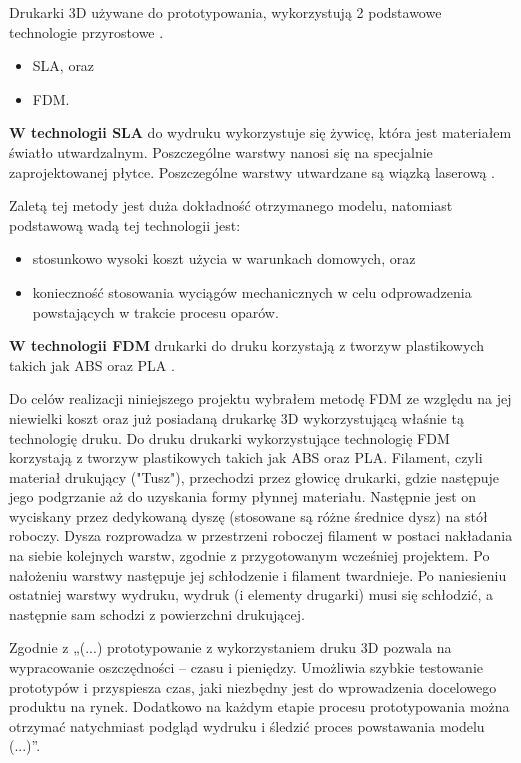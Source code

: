 \documentclass[a4paper,12pt,reqno]{article}
\begin{document}
Drukarki 3D używane do prototypowania, wykorzystują 2 podstawowe technologie przyrostowe
\cite{prototyp3dzalety}.
\begin{itemize}
\item SLA, oraz
\item FDM.
\end{itemize}
\textbf{W technologii SLA} do wydruku wykorzystuje się żywicę, która jest materiałem światło utwardzalnym. Poszczególne warstwy nanosi się na specjalnie zaprojektowanej płytce. Poszczególne warstwy utwardzane są wiązką laserową \cite{jakie_materialy_w_druku}.

Zaletą tej metody jest duża dokładność otrzymanego modelu, natomiast podstawową wadą tej technologii jest:
\begin{itemize}
\item stosunkowo wysoki koszt użycia w warunkach domowych, oraz
\item konieczność stosowania wyciągów mechanicznych w celu odprowadzenia powstających w trakcie procesu oparów.
\end{itemize}

\textbf{W technologii FDM} drukarki do druku korzystają z tworzyw plastikowych takich jak ABS oraz PLA \cite{jak_wybrac_tworzywo_do_drukarek} \cite{jakie_materialy_w_druku}.

Do celów realizacji niniejszego projektu wybrałem metodę FDM ze względu na jej niewielki koszt oraz już posiadaną drukarkę 3D wykorzystującą właśnie tą technologię druku. 
Do druku drukarki wykorzystujące technologię FDM korzystają z tworzyw plastikowych takich jak ABS oraz PLA.
Filament, czyli materiał drukujący ("Tusz"), przechodzi przez głowicę drukarki, gdzie następuje jego podgrzanie aż do uzyskania formy płynnej materiału. 
Następnie jest on wyciskany przez dedykowaną dyszę (stosowane są różne średnice dysz) na stół roboczy. 
Dysza rozprowadza w przestrzeni roboczej filament w postaci nakładania na siebie kolejnych warstw, zgodnie z przygotowanym wcześniej projektem. 
Po nałożeniu warstwy następuje jej schłodzenie i filament twardnieje. 
Po naniesieniu ostatniej warstwy wydruku, wydruk (i elementy drugarki) musi się schłodzić, a następnie sam schodzi z powierzchni drukującej.

Zgodnie z \cite{prototyp3dzalety} „(...) prototypowanie z wykorzystaniem druku 3D pozwala na wypracowanie oszczędności – czasu i pieniędzy. Umożliwia szybkie testowanie prototypów i przyspiesza czas, jaki niezbędny jest do wprowadzenia docelowego produktu na rynek. Dodatkowo na każdym etapie procesu prototypowania można otrzymać natychmiast podgląd wydruku i śledzić proces powstawania modelu (...)”.
\end{document}
